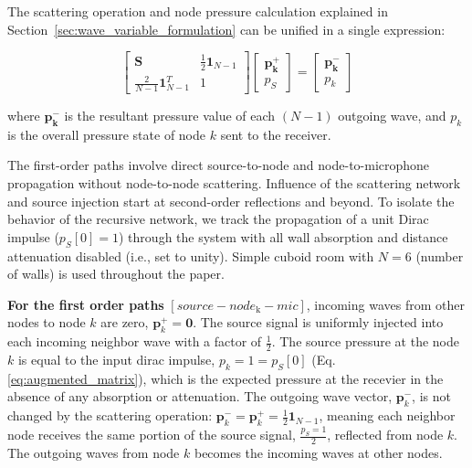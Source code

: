 \documentclass[journal]{IEEEtran}
\begin{document}
The scattering operation and node pressure calculation explained in 
Section~\ref{sec:wave_variable_formulation} can be unified in a single expression:

\begin{equation}
\label{eq:augmented_matrix}
\begin{bmatrix}
    \mathbf{S} & \frac{1}{2}\mathbf{1}_{N-1} \\
    \frac{2}{N-1}\mathbf{1}_{N-1}^T & 1
\end{bmatrix}
\begin{bmatrix}
\mathbf{p_k^+} \\
p_{S}
\end{bmatrix}
=
\begin{bmatrix}
\mathbf{p_k^-} \\
p_k
\end{bmatrix}
\end{equation}

where $\mathbf{p_k^-}$ is the resultant pressure value of each $(N-1)$ outgoing wave, and $p_k$ is the overall pressure state of node $k$ sent to the receiver.

The first-order paths involve direct source-to-node and node-to-microphone propagation without node-to-node scattering. Influence of the scattering network and source injection start at second-order reflections and beyond. To isolate the behavior of the recursive network, we track the propagation of a unit Dirac impulse ($p_S[0]=1$) through the system with all wall absorption and distance attenuation disabled (i.e., set to unity). Simple cuboid room with $N=6$ (number of walls) is used throughout the paper.

\textbf{For the first order paths} $[source-node_{\text{k}}-mic]$, incoming waves from other nodes to node \(k\) are zero, $\mathbf{p}_k^+ = \mathbf{0}$. The source signal is uniformly injected into each incoming neighbor wave with a factor of $\frac{1}{2}$. 
The source pressure at the node \(k\) is equal to the input dirac impulse,  $p_k=1=p_{S}[0]$ (Eq. \eqref{eq:augmented_matrix}), which is the expected pressure at the recevier in the absence of any absorption or attenuation. The outgoing wave vector, $\mathbf{p}_k^-$, is not changed by the scattering operation: $\mathbf{p}_k^- = \mathbf{p}_k^+ = \frac{1}{2}\mathbf{1}_{N-1}$, meaning each neighbor node receives the same portion of the source signal,  $\frac{p_S=1}{2}$, reflected from node \(k\). The outgoing waves from node \(k\) becomes the incoming waves at other nodes. 
\end{document}
